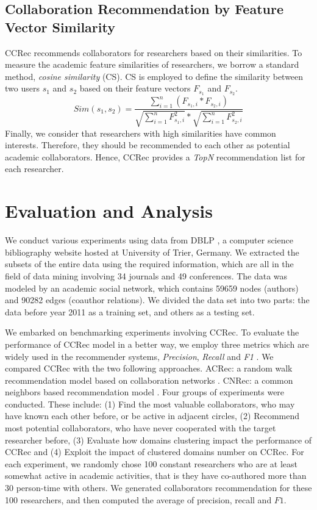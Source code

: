 \documentclass[review]{elsarticle}
\begin{document}
\subsection{Collaboration Recommendation by Feature Vector Similarity}
CCRec recommends collaborators for researchers based on their similarities. To measure the academic feature similarities of researchers, we borrow a standard method, \emph{cosine similarity} (CS). CS is employed to define the similarity between two users $s_{1}$ and $s_{2}$ based on their feature vectors $F_{s_{1}}$ and $F_{s_{2}}$.
\begin{equation}
Sim(s_{1},s_{2})=\frac{\sum_{i=1}^{n}(F_{s_{1},i}*F_{s_{2},i})}{\sqrt{\sum_{i=1}^{n}F_{s_{1},i}^2}*\sqrt{\sum_{i=1}^{n}F_{s_{2},i}^2}}
\end{equation}
Finally, we consider that researchers with high similarities have common interests. Therefore, they should be recommended to each other as potential academic collaborators. Hence, CCRec provides a \emph{TopN} recommendation list for each researcher.

\section{Evaluation and Analysis}
We conduct various experiments using data from DBLP \cite{Ley:DBLP}, a computer science bibliography website hosted at University of Trier, Germany. We extracted the subsets of the entire data using the required information, which are all in the field of data mining involving 34 journals and 49 conferences. The data was modeled by an academic social network, which contains 59659 nodes (authors) and 90282 edges (coauthor relations). We divided the data set into two parts: the data before year 2011 as a training set, and others as a testing set.

We embarked on benchmarking experiments involving CCRec. To evaluate the performance of CCRec model in a better way, we employ three metrics which are widely used in the recommender systems, \emph{Precision}, \emph{Recall} and \emph{F1} \cite{shani2011evaluating}. We compared CCRec with the two following approaches. ACRec: a random walk recommendation model based on collaboration networks \cite{li2014acrec}. CNRec: a common neighbors based recommendation model \cite{lopes2010collaboration}. Four groups of experiments were conducted. These include: (1) Find the most valuable collaborators, who may have known each other before, or be active in adjacent circles, (2) Recommend most potential collaborators, who have never cooperated with the target researcher before, (3) Evaluate how domains clustering impact the performance of CCRec and (4) Exploit the impact of clustered domains number on CCRec. For each experiment, we randomly chose 100 constant researchers who are at least somewhat active in academic activities, that is they have co-authored more than 30 person-time with others. We generated collaborators recommendation for these 100 researchers, and then computed the average of precision, recall and $F1$.
\end{document}
